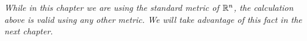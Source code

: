 \begin{oss}
	{\em While in this chapter we are using the standard metric of $\mathbb{R}^n$, the calculation above is valid using any other metric. We will take advantage of this fact in the next chapter.}
\end{oss}

